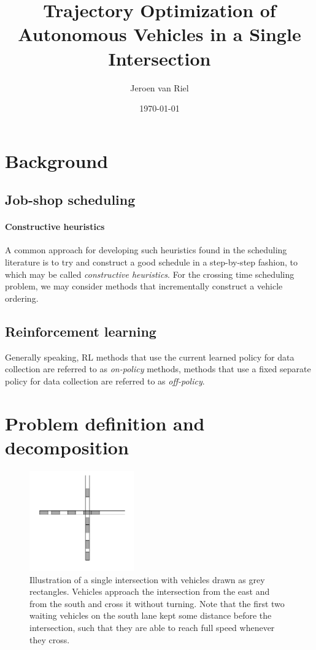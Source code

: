 \documentclass[a4paper]{article}
\author{Jeroen van Riel}
\date{\monthyeardate\today}
\title{Trajectory Optimization of Autonomous Vehicles in a Single Intersection}
\theoremstyle{definition}
\theoremstyle{plain}
\begin{document}
\maketitle

\tableofcontents


\section{Background}


\subsection{Job-shop scheduling}

\paragraph{Constructive heuristics}
A common approach for developing such heuristics found in the scheduling
literature is to try and construct a good schedule in a step-by-step fashion, to
which may be called \textit{constructive heuristics}. For the crossing time
scheduling problem, we may consider methods that incrementally construct a
vehicle ordering.

\subsection{Reinforcement learning}

Generally speaking, RL methods that use the current learned policy for data
collection are referred to as \textit{on-policy} methods, methods that use a
fixed separate policy for data collection are referred to as
\textit{off-policy}.


\section{Problem definition and decomposition}

\begin{figure}
  \centering
  \includegraphics[width=0.4\textwidth]{figures/single/single_intersection_example.png}
  \caption{Illustration of a single intersection with vehicles drawn as grey
    rectangles. Vehicles approach the intersection from the east and from the
    south and cross it without turning. Note that the first two waiting vehicles
    on the south lane kept some distance before the intersection, such that they
    are able to reach full speed whenever they
    cross.}\label{fig:intersection_illustration}
\end{figure}
\end{document}
